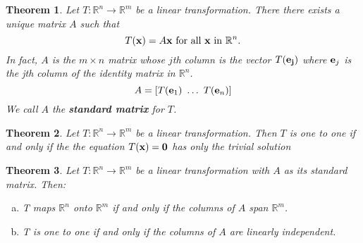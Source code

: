 \documentclass[12pt,letterpaper]{article}
\newcommand{\rr}{\mathbb R}     %
\newcommand{\x}{{\bf x}}
\newcommand{\0}{{\bf 0}}
\theoremstyle{plain}
\newtheorem{theorem}{Theorem}
\theoremstyle{definition}
\begin{document}
\begin{theorem}
Let $T:\rr^n\rightarrow \rr^m$ be a linear transformation. There there exists a unique matrix $A$ such that 
\[T(\x)=A\x \text{ for all }\x\text{ in }\rr^n.\]
In fact, $A$ is the $m\times n$ matrix whose $j$th column is the vector $T({\bf e_{j}})$ where ${\bf e}_j$ is the jth column of the identity matrix in $\rr^n$.
\[A=[T({\bf e}_1)\ \dots \ T({\bf e}_n)]\]
We call $A$ the {\bf standard matrix} for $T$. 
\end{theorem}
\begin{theorem} Let $T:\rr^n\rightarrow \rr^m$ be a linear transformation. Then $T$ is one to one if and only if the the equation $T(\x)=\0$ has only the trivial solution 
\end{theorem}
\begin{theorem} Let $T:\rr^n\rightarrow \rr^m$ be a linear transformation with $A$ as its standard matrix. Then:
\begin{enumerate}[(a)]
\item T maps $\rr^n$ onto $\rr^m$ if and only if the columns of $A$ span $\rr^m$.
\item T is one to one if and only if the columns of $A$ are linearly independent. 
\end{enumerate}
\end{theorem}
\end{document}
